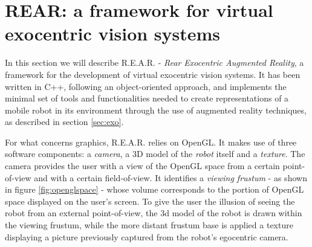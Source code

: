 \section{\textsf{REAR:} a framework for virtual exocentric vision systems}
\label{sec:rear}
In this section we will describe \textsf{R.E.A.R.} - 
\textit{Rear Exocentric Augmented Reality}, a framework 
for the development of virtual exocentric vision systems.
%
It has been written in C++, following an object-oriented 
approach, and implements the minimal set of tools and functionalities 
needed to create representations of a mobile robot in its environment 
through the use of augmented reality techniques, as described in 
section \ref{sec:exo}.
%

%
For what concerns graphics, \textsf{R.E.A.R.} relies on OpenGL.
It makes use of three software components: a \textit{camera}, 
a 3D model of the \textit{robot} itself and a \textit{texture}.
%
The camera provides the user with a view of the OpenGL space 
from a certain point-of-view and with a certain field-of-view. 
It identifies a \textit{viewing frustum} - as shown in figure 
\ref{fig:openglspace} - whose volume corresponds to the 
portion of OpenGL space displayed on the user's screen.
%
To give the user the illusion of seeing the robot from an 
external point-of-view, the 3d model of the robot is drawn 
within the viewing frustum, while the more distant frustum base 
is applied a texture displaying a picture previously 
captured from the robot's egocentric camera.
%

